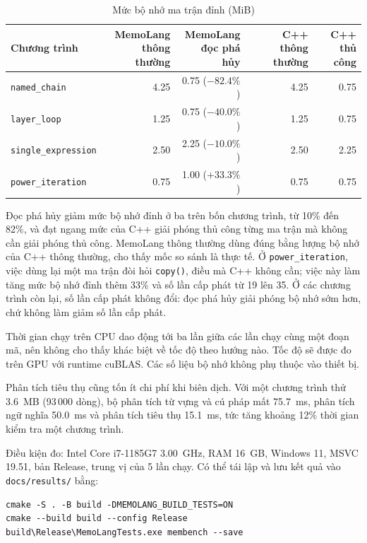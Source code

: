 \documentclass[a4paper]{article}
\begin{document}
	\begin{table}[h]
		\centering
		\caption{Mức bộ nhớ ma trận đỉnh (MiB)}
		\label{tab:results}
		\small
		\begin{tabular}{@{}lrrrr@{}}
			\toprule
			Chương trình & \shortstack[r]{MemoLang\\thông thường} & \shortstack[r]{MemoLang\\đọc phá hủy} & \shortstack[r]{C++\\thông thường} & \shortstack[r]{C++\\thủ công} \\
			\midrule
			\texttt{named\_chain} & 4.25 & 0.75 ($-82.4\%$) & 4.25 & 0.75 \\
			\texttt{layer\_loop} & 1.25 & 0.75 ($-40.0\%$) & 1.25 & 0.75 \\
			\texttt{single\_expression} & 2.50 & 2.25 ($-10.0\%$) & 2.50 & 2.25 \\
			\texttt{power\_iteration} & 0.75 & 1.00 ($+33.3\%$) & 0.75 & 0.75 \\
			\bottomrule
		\end{tabular}
	\end{table}

	Đọc phá hủy giảm mức bộ nhớ đỉnh ở ba trên bốn chương trình, từ 10\% đến 82\%, và đạt ngang mức của C++ giải phóng thủ công từng ma trận mà không cần giải phóng thủ công. MemoLang thông thường dùng đúng bằng lượng bộ nhớ của C++ thông thường, cho thấy mốc so sánh là thực tế. Ở \texttt{power\_iteration}, việc dùng lại một ma trận đòi hỏi \texttt{copy()}, điều mà C++ không cần; việc này làm tăng mức bộ nhớ đỉnh thêm 33\% và số lần cấp phát từ 19 lên 35. Ở các chương trình còn lại, số lần cấp phát không đổi: đọc phá hủy giải phóng bộ nhớ sớm hơn, chứ không làm giảm số lần cấp phát.

	Thời gian chạy trên CPU dao động tới ba lần giữa các lần chạy cùng một đoạn mã, nên không cho thấy khác biệt về tốc độ theo hướng nào. Tốc độ sẽ được đo trên GPU với runtime cuBLAS. Các số liệu bộ nhớ không phụ thuộc vào thiết bị.

	Phân tích tiêu thụ cũng tốn ít chi phí khi biên dịch. Với một chương trình thử 3.6~MB (93\,000 dòng), bộ phân tích từ vựng và cú pháp mất 75.7~ms, phân tích ngữ nghĩa 50.0~ms và phân tích tiêu thụ 15.1~ms, tức tăng khoảng 12\% thời gian kiểm tra một chương trình.

	Điều kiện đo: Intel Core i7-1185G7 3.00~GHz, RAM 16~GB, Windows 11, MSVC 19.51, bản Release, trung vị của 5 lần chạy. Có thể tái lập và lưu kết quả vào \texttt{docs/results/} bằng:
	\begin{lstlisting}[caption = Tái lập các phép đo]
cmake -S . -B build -DMEMOLANG_BUILD_TESTS=ON
cmake --build build --config Release
build\Release\MemoLangTests.exe membench --save
	\end{lstlisting}
\end{document}
